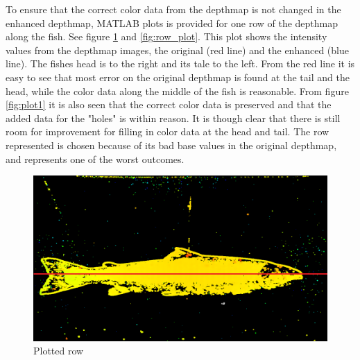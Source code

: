 To ensure that the correct color data from the depthmap is not changed in the enhanced depthmap, MATLAB plots is provided for one row of the depthmap along the fish. See figure \ref{fig:sectional} and \ref{fig:row_plot}. This plot shows the intensity values from the depthmap images, the original (red line) and the enhanced (blue line). The fishes head is to the right and its tale to the left. From the red line it is easy to see that most error on the original depthmap is found at the tail and the head, while the color data along the middle of the fish is reasonable. From figure \ref{fig:plot1} it is also seen that the correct color data is preserved and that the added data for the "holes" is within reason. It is though clear that there is still room for improvement for filling in color data at the head and tail. 
The row represented is chosen because of its bad base values in the original depthmap, and represents one of the worst outcomes.


\begin{figure}[H]
    \centering
    \includegraphics[width=.7\linewidth]{images/results/sectional}
    \caption{Plotted row}
    \label{fig:sectional}
\end{figure}


